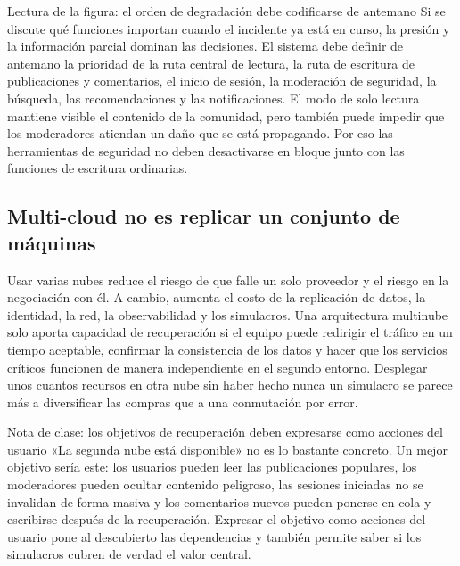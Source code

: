 \documentclass[a4paper]{article}
\begin{document}
\begin{knowledgebox}{Lectura de la figura: el orden de degradación debe codificarse de antemano}
Si se discute qué funciones importan cuando el incidente ya está en curso, la presión y la información parcial dominan las decisiones. El sistema debe definir de antemano la prioridad de la ruta central de lectura, la ruta de escritura de publicaciones y comentarios, el inicio de sesión, la moderación de seguridad, la búsqueda, las recomendaciones y las notificaciones. El modo de solo lectura mantiene visible el contenido de la comunidad, pero también puede impedir que los moderadores atiendan un daño que se está propagando. Por eso las herramientas de seguridad no deben desactivarse en bloque junto con las funciones de escritura ordinarias.
\end{knowledgebox}

\subsection{Multi-cloud no es replicar un conjunto de máquinas}

Usar varias nubes reduce el riesgo de que falle un solo proveedor y el riesgo en la negociación con él. A cambio, aumenta el costo de la replicación de datos, la identidad, la red, la observabilidad y los simulacros. Una arquitectura multinube solo aporta capacidad de recuperación si el equipo puede redirigir el tráfico en un tiempo aceptable, confirmar la consistencia de los datos y hacer que los servicios críticos funcionen de manera independiente en el segundo entorno. Desplegar unos cuantos recursos en otra nube sin haber hecho nunca un simulacro se parece más a diversificar las compras que a una conmutación por error.

\begin{importantbox}{Nota de clase: los objetivos de recuperación deben expresarse como acciones del usuario}
«La segunda nube está disponible» no es lo bastante concreto. Un mejor objetivo sería este: los usuarios pueden leer las publicaciones populares, los moderadores pueden ocultar contenido peligroso, las sesiones iniciadas no se invalidan de forma masiva y los comentarios nuevos pueden ponerse en cola y escribirse después de la recuperación. Expresar el objetivo como acciones del usuario pone al descubierto las dependencias y también permite saber si los simulacros cubren de verdad el valor central.
\end{importantbox}
\end{document}
